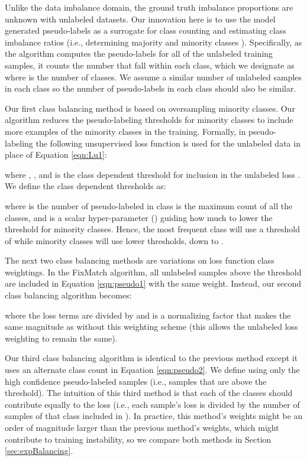 \documentclass[final]{cvpr}
\newcommand{\FM}{FixMatch }
\begin{document}
Unlike the data imbalance domain, the ground truth imbalance proportions are unknown with unlabeled datasets.
Our innovation here is to use the model generated pseudo-labels as a surrogate for class counting and estimating class imbalance ratios (i.e., determining majority and minority classes ).
Specifically, as the algorithm computes the pseudo-labels for all of the unlabeled training samples, it counts the number that fall within each class, which we designate as  where  is the number of classes.
We assume a similar number of unlabeled samples in each class so the number of pseudo-labels in each class should also be similar.


Our first class balancing method is based on oversampling minority classes.
Our algorithm reduces the pseudo-labeling thresholds for minority classes to include more examples of the minority classes in the training.
Formally, in pseudo-labeling the following unsupervised loss function is used for the unlabeled data in place of Equation \ref{eqn:Lu1}:

where , , and  is the class dependent threshold for inclusion in the unlabeled loss .
We define the class dependent thresholds as:

where  is the number of pseudo-labeled in class  is the maximum count of all the classes, and  is a scalar hyper-parameter () guiding how much to lower the threshold for minority classes.
Hence, the most frequent class will use a threshold of  while minority classes will use lower thresholds, down to .

The next two class balancing methods are variations on loss function class weightings.
In the \FM algorithm, all unlabeled samples above the threshold are included in Equation \ref{eqn:pseudo1} with the same weight.
Instead, our second class balancing algorithm becomes:

where the loss terms are divided by    and  is a normalizing factor that makes  the same magnitude as without this weighting scheme (this allows the unlabeled loss weighting  to remain the same).

Our third class balancing algorithm is identical to the previous method except it uses an alternate class count  in Equation \ref{eqn:pseudo2}.
We define  using only the high confidence pseudo-labeled samples (i.e., samples that are above the threshold).
The intuition of this third method is that each of the classes should contribute equally to the loss  (i.e., each sample's loss is divided by the number of samples of that class included in  ).
In practice, this method's weights might be an order of magnitude larger than the previous method's weights, which might contribute to training instability, so we compare both methods in Section \ref{sec:expBalancing}.
\end{document}
